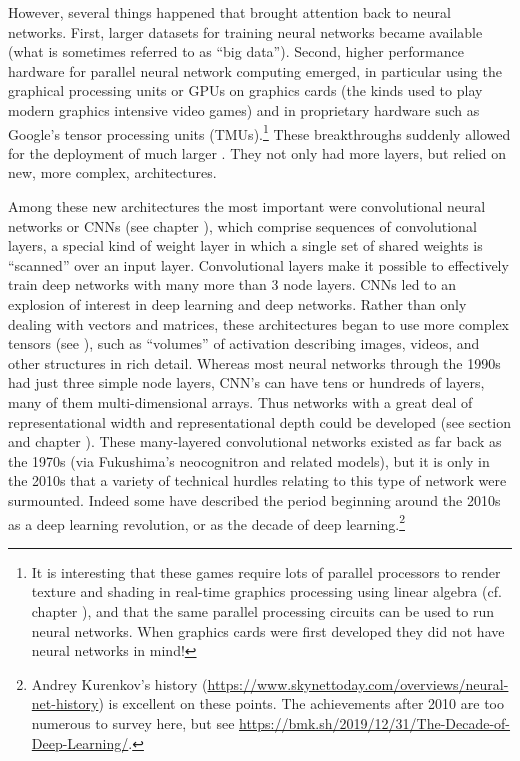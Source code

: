 However, several things happened that brought attention back to neural networks. First, larger datasets for training neural networks became available (what is sometimes referred to as ``big data''). Second, higher performance hardware for parallel neural network computing emerged, in particular using the graphical processing units or GPUs on graphics cards (the kinds used to play modern graphics intensive video games) and in proprietary hardware such as Google's tensor processing units (TMUs).\footnote{It is interesting that these games require lots of parallel processors to render texture and shading in real-time graphics processing using linear algebra (cf. chapter ), and that the same parallel processing circuits can be used to run neural networks. When graphics cards were first developed they did not have neural networks in mind!} These breakthroughs suddenly allowed for the deployment of much larger . They not only had more layers, but relied on new, more complex, architectures.

Among these new architectures the most important were convolutional neural networks or CNNs (see   chapter ), which comprise sequences of convolutional layers, a special kind of weight layer in which a single set of shared weights is “scanned” over an input layer. Convolutional layers make it possible to effectively train deep networks with many more than 3 node layers.  CNNs led to an explosion of interest in deep learning and deep networks. Rather than only dealing with vectors and matrices, these architectures began to use more complex tensors (see ), such as ``volumes'' of activation describing images, videos, and other structures in rich detail.  Whereas most neural networks through the 1990s had just three simple node layers, CNN's can have tens or hundreds of layers, many of them multi-dimensional arrays. Thus networks with  a great deal of representational width and representational depth could be developed (see section  and chapter ). These many-layered convolutional networks existed as far back as the 1970s (via Fukushima's neocognitron and related models), but it is only in the 2010s  that a variety of technical hurdles relating to this type of network were surmounted. Indeed some have described the period beginning around the 2010s as a deep learning revolution, or as the decade of deep learning.\footnote{Andrey Kurenkov's history (\url{https://www.skynettoday.com/overviews/neural-net-history}) is excellent on these points. The achievements after 2010 are too numerous to survey here, but see \url{https://bmk.sh/2019/12/31/The-Decade-of-Deep-Learning/}.}  

